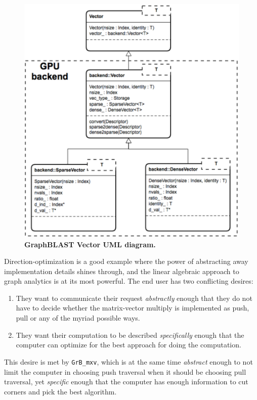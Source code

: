 \begin{figure}[t]
	\includegraphics[width=\linewidth]{fig/graphblast}
	\caption{\textbf{GraphBLAST Vector UML diagram.}\label{fig:graphblast}}
\end{figure}

Direction-optimization is a good example where the power of abstracting away implementation details shines through, and the linear algebraic approach to graph analytics is at its most powerful. The end user has two conflicting desires:

\begin{enumerate}
	\item They want to communicate their request \emph{abstractly} enough that they do not have to decide whether the matrix-vector multiply is implemented as push, pull or any of the myriad possible ways.
	\item They want their computation to be described \emph{specifically} enough that the computer can optimize for the best approach for doing the computation.
\end{enumerate}

This desire is met by \verb'GrB_mxv', which is at the same time \emph{abstract} enough to not limit the computer in choosing push traversal when it should be choosing pull traversal, yet \emph{specific} enough that the computer has enough information to cut corners and pick the best algorithm.

